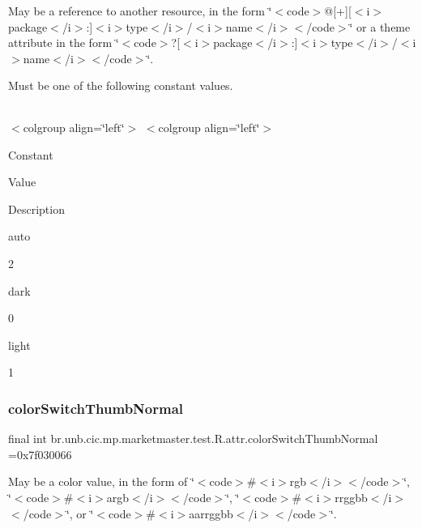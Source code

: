 May be a reference to another resource, in the form \char`\"{}$<$code$>$@\mbox{[}+\mbox{]}\mbox{[}$<$i$>$package$<$/i$>$\+:\mbox{]}$<$i$>$type$<$/i$>$/$<$i$>$name$<$/i$>$$<$/code$>$\char`\"{} or a theme attribute in the form \char`\"{}$<$code$>$?\mbox{[}$<$i$>$package$<$/i$>$\+:\mbox{]}$<$i$>$type$<$/i$>$/$<$i$>$name$<$/i$>$$<$/code$>$\char`\"{}. 

Must be one of the following constant values.

\tabulinesep=1mm
\begin{longtabu} spread 0pt [c]{*{0}{|X[-1]}|}
\hline
\end{longtabu}
$<$colgroup align=\char`\"{}left\char`\"{}$>$ $<$colgroup align=\char`\"{}left\char`\"{}$>$ 

Constant

Value

Description 

auto

2

dark

0

light

1\mbox{\label{classbr_1_1unb_1_1cic_1_1mp_1_1marketmaster_1_1test_1_1R_1_1attr_a50e0bf61ecf89a078d0573f1c0f0a3cf}} 
\subsubsection{\texorpdfstring{color\+Switch\+Thumb\+Normal}{colorSwitchThumbNormal}}
{\footnotesize\ttfamily final int br.\+unb.\+cic.\+mp.\+marketmaster.\+test.\+R.\+attr.\+color\+Switch\+Thumb\+Normal =0x7f030066\hspace{0.3cm}{\ttfamily [static]}}

May be a color value, in the form of \char`\"{}$<$code$>$\#$<$i$>$rgb$<$/i$>$$<$/code$>$\char`\"{}, \char`\"{}$<$code$>$\#$<$i$>$argb$<$/i$>$$<$/code$>$\char`\"{}, \char`\"{}$<$code$>$\#$<$i$>$rrggbb$<$/i$>$$<$/code$>$\char`\"{}, or \char`\"{}$<$code$>$\#$<$i$>$aarrggbb$<$/i$>$$<$/code$>$\char`\"{}. \mbox{\label{classbr_1_1unb_1_1cic_1_1mp_1_1marketmaster_1_1test_1_1R_1_1attr_ad64d282d20d22e5cf21fa7209c8f2a02}} 
